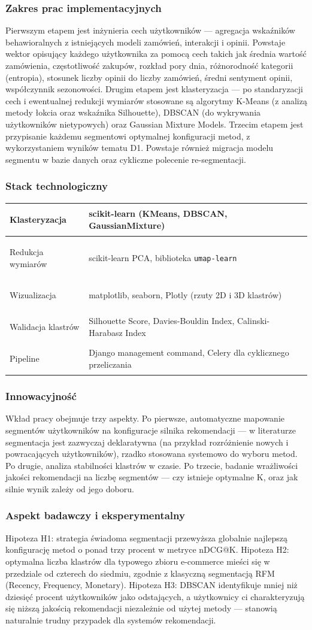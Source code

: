 \documentclass[12pt,a4paper]{article}
\newenvironment{stacktab}{%
    \arrayrulecolor{border}%
    \begin{tabular}{|>{\columncolor{lightbg}\bfseries\color{primary}\raggedright\arraybackslash}p{4.2cm}|>{\raggedright\arraybackslash}p{12cm}|}
    \hline
}{%
    \end{tabular}%
    \arrayrulecolor{black}%
}
\newcommand{\stackrow}[2]{#1 & #2 \\ \hline}
\newcommand{\topicsection}[1]{\subsubsection*{#1}}
\begin{document}
\topicsection{Zakres prac implementacyjnych}
Pierwszym etapem jest inżynieria cech użytkowników --- agregacja wskaźników behawioralnych z istniejących modeli zamówień, interakcji i opinii. Powstaje wektor opisujący każdego użytkownika za pomocą cech takich jak średnia wartość zamówienia, częstotliwość zakupów, rozkład pory dnia, różnorodność kategorii (entropia), stosunek liczby opinii do liczby zamówień, średni sentyment opinii, współczynnik sezonowości. Drugim etapem jest klasteryzacja --- po standaryzacji cech i ewentualnej redukcji wymiarów stosowane są algorytmy K-Means (z analizą metody łokcia oraz wskaźnika Silhouette), DBSCAN (do wykrywania użytkowników nietypowych) oraz Gaussian Mixture Models. Trzecim etapem jest przypisanie każdemu segmentowi optymalnej konfiguracji metod, z wykorzystaniem wyników tematu D1. Powstaje również migracja modelu segmentu w bazie danych oraz cykliczne polecenie re-segmentacji.

\topicsection{Stack technologiczny}
\begin{stacktab}
\stackrow{Klasteryzacja}{scikit-learn (KMeans, DBSCAN, GaussianMixture)}
\stackrow{Redukcja wymiarów}{scikit-learn PCA, biblioteka \texttt{umap-learn}}
\stackrow{Wizualizacja}{matplotlib, seaborn, Plotly (rzuty 2D i 3D klastrów)}
\stackrow{Walidacja klastrów}{Silhouette Score, Davies-Bouldin Index, Calinski-Harabasz Index}
\stackrow{Pipeline}{Django management command, Celery dla cyklicznego przeliczania}
\end{stacktab}

\topicsection{Innowacyjność}
Wkład pracy obejmuje trzy aspekty. Po pierwsze, automatyczne mapowanie segmentów użytkowników na konfiguracje silnika rekomendacji --- w literaturze segmentacja jest zazwyczaj deklaratywna (na przykład rozróżnienie nowych i powracających użytkowników), rzadko stosowana systemowo do wyboru metod. Po drugie, analiza stabilności klastrów w czasie. Po trzecie, badanie wrażliwości jakości rekomendacji na liczbę segmentów --- czy istnieje optymalne K, oraz jak silnie wynik zależy od jego doboru.

\topicsection{Aspekt badawczy i eksperymentalny}
Hipoteza H1: strategia świadoma segmentacji przewyższa globalnie najlepszą konfigurację metod o ponad trzy procent w metryce nDCG@K. Hipoteza H2: optymalna liczba klastrów dla typowego zbioru e-commerce mieści się w przedziale od czterech do siedmiu, zgodnie z klasyczną segmentacją RFM (Recency, Frequency, Monetary). Hipoteza H3: DBSCAN identyfikuje mniej niż dziesięć procent użytkowników jako odstających, a użytkownicy ci charakteryzują się niższą jakością rekomendacji niezależnie od użytej metody --- stanowią naturalnie trudny przypadek dla systemów rekomendacji.
\end{document}
